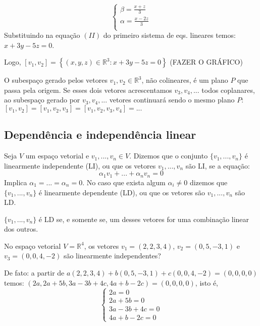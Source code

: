 \begin{equation*}
\begin{cases}
\beta=\frac{x+z}{3}   \\
\alpha=\frac{x-2z}{3} \\ 
\end{cases}
\end{equation*}
Substituindo na equação $(II)$ do primeiro sistema de eqs. lineares temos: $x+3y-5z=0$.

Logo, $[v_{1},v_{2}]=\left\lbrace(x,y,z)\in \mathbb{R}^{3}:x+3y-5z=0 \right\rbrace $ (FAZER O GRÁFICO)

O subespaço gerado pelos vetores $v_{1}, v_{2}\in \mathbb{R}^{3}$, não colineares, é um plano $P$ que passa pela origem. Se esses dois vetores acrescentamos $v_{3},v_{4},...$ todos coplanares, ao subespaço gerado por $v_{3},v_{4},...$ vetores continuará sendo o mesmo plano $P$: $[v_{1},v_{2}]=[v_{1},v_{2},v_{3}]=[v_{1},v_{2},v_{3},v_{4}]=...$

\subsection{Dependência e independência linear}

\begin{df}
	Seja $V$ um espaço vetorial e $v_{1},...,v_{n}\in V$. Dizemos que o conjunto $\{v_{1},...,v_{n}\}$ é linearmente independente (LI), ou que os vetores $v_{1},...,v_{n}$ são LI, se a equação:
	\begin{equation*}
	\alpha_{1}v_{1}+...+\alpha_{n}v_{n}=0
	\end{equation*}
	Implica $\alpha_{1}=...=\alpha_{n}=0$. No caso que exista algum $\alpha_{i} \neq 0$ dizemos que $\{v_{1},...,v_{n}\}$ é linearmente dependente (LD), ou que os vetores são $v_{1},...,v_{n}$ são LD. 
\end{df}

\begin{teo}
	$\{v_{1},...,v_{n}\}$ é LD se, e somente se, um desses vetores for uma combinação linear dos outros.
\end{teo}

\begin{ex}
No espaço vetorial $V=\mathbb{R}^{4}$, os vetores $v_{1}=(2,2,3,4)$, $v_{2}=(0,5,-3,1)$ e $v_{3}=(0,0,4,-2)$ são linearmente independentes?
\end{ex}
De fato: a partir de $a(2,2,3,4)+b(0,5,-3,1)+c(0,0,4,-2)=(0,0,0,0)$ temos: $(2a,2a+5b,3a-3b+4c,4a+b-2c)=(0,0,0,0)$, isto é, 
\begin{equation*}
\begin{cases}
2a=0   \\
2a+5b=0 \\
3a-3b+4c=0\\
4a+b-2c=0 
\end{cases}
\end{equation*}


